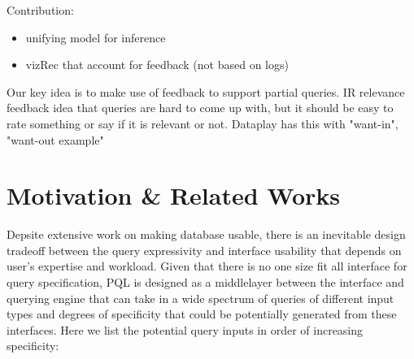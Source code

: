 \documentclass{sig-alternate-05-2015}
\begin{document}
Contribution: 
\begin{itemize}
\item unifying model for inference
\item vizRec that account for feedback (not based on logs)
\end{itemize}

Our key idea is to make use of feedback to support partial queries. 
IR relevance feedback
idea that queries are hard to come up with, but it should be easy to rate something or say if it is relevant or not. 
Dataplay has this with "want-in", "want-out example"
\section{Motivation \& Related Works}
\par Depsite extensive work on making database usable, there is an inevitable design tradeoff between the query expressivity and interface usability that depends on user's expertise and workload\cite{Jagadish2007,Morton2014}. Given that there is no one size fit all interface for query specification, PQL is designed as a middlelayer between the interface and querying engine that can take in a wide spectrum of queries of different input types and degrees of specificity that could be potentially generated from these interfaces. Here we list the potential query inputs in order of increasing specificity: 
\end{document}
